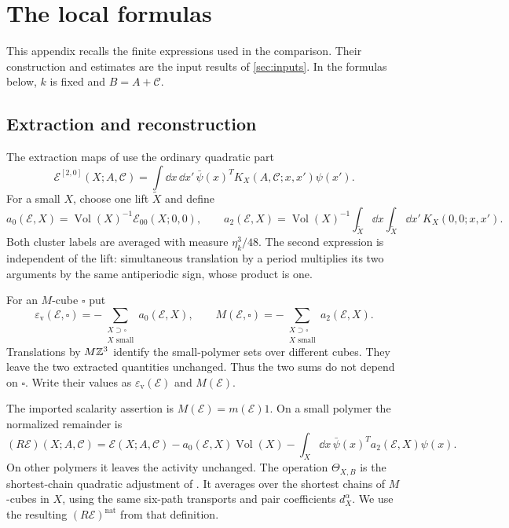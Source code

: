 \section{The local formulas}\label{app:formulas}
This appendix recalls the finite expressions used in the comparison.
Their construction and estimates are the input results of
\cref{sec:inputs}. In the formulas below, $k$ is fixed and
$B=A+\mathscr C$.

\subsection{Extraction and reconstruction}
The extraction maps of \cite[\S3.1]{NormalizedContraction} use the
ordinary quadratic part
\[
 \mathscr E^{[2,0]}(X;A,\mathscr C)=\int\dd x\,\dd x'\,
 \bar\psi(x)^T K_X(A,\mathscr C;x,x')\psi(x').
\]
For a small $X$, choose one lift $\widetilde X$ and define
\begin{equation}\label{eq:rg-local-extractions}
 a_0(\mathscr E,X)
       =\operatorname{Vol}(X)^{-1}\mathscr E_{00}(X;0,0),\qquad
 a_2(\mathscr E,X)
       =\operatorname{Vol}(X)^{-1}
             \int_{\widetilde X}\dd x\int_{\widetilde X}\dd x'\,
                                                    K_X(0,0;x,x').
\end{equation}
Both cluster labels are averaged with measure $\eta_k^3/48$.
The second expression is independent of the lift: simultaneous
translation by a period multiplies its two arguments by the
same antiperiodic sign, whose product is one.

For an $M$-cube $\square$ put
\begin{equation}\label{eq:rg-counterterm-maps}
 \varepsilon_{\mathrm v}(\mathscr E,\square)
          =-\sum_{\substack{X\supset\square\\X\text{ small}}}
                                                     a_0(\mathscr E,X),
 \qquad
 M(\mathscr E,\square)
          =-\sum_{\substack{X\supset\square\\X\text{ small}}}
                                                     a_2(\mathscr E,X).
\end{equation}
Translations by $M\mathbb Z^3$ identify the small-polymer sets over
different cubes. They leave the two extracted quantities
unchanged. Thus the two sums do not depend on $\square$.
Write their values as $\varepsilon_{\mathrm v}(\mathscr E)$ and
$M(\mathscr E)$.

The imported scalarity assertion is $M(\mathscr E)=m(\mathscr E)1$.
On a small polymer the normalized remainder is
\cite[(17)]{NormalizedContraction}
\begin{equation}\label{eq:rg-normalized-remainder}
 (R\mathscr E)(X;A,\mathscr C)=\mathscr E(X;A,\mathscr C)
 -a_0(\mathscr E,X)\operatorname{Vol}(X)
 -\int_X\dd x\,\bar\psi(x)^Ta_2(\mathscr E,X)\psi(x).
\end{equation}
On other polymers it leaves the activity unchanged.
The operation $\Theta_{X,B}$ is the
shortest-chain quadratic adjustment of \cite[\S3.2]{NormalizedContraction}.
It averages over the shortest chains of $M$-cubes in $X$, using the
same six-path transports and pair coefficients $d_X^\alpha$.
We use the resulting $(R\mathscr E)^{\mathrm{nat}}$ from that definition.

